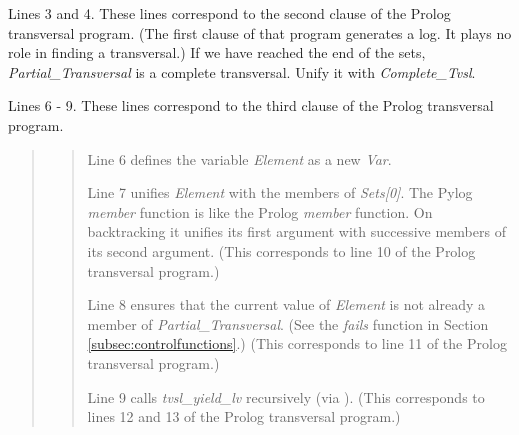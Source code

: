 Lines 3 and 4. These lines correspond to the second clause of the Prolog transversal program. (The first clause of that program generates a log. It plays no role in finding a transversal.) If we have reached the end of the sets, \textit{Partial\_Transversal} is a complete transversal. Unify it with \textit{Complete\_Tvsl}.

Lines 6 - 9. These lines correspond to the third clause of the Prolog transversal program.

\begin{quote}
\begin{quote}
Line 6 defines the variable \textit{Element} as a new \textit{Var}.

\smallv
Line 7 unifies \textit{Element} with the members of \textit{Sets[0]}. The Pylog \textit{member} function is like the Prolog  \textit{member} function. On backtracking it unifies its first argument with successive members of its second argument. (This corresponds to line 10 of the Prolog transversal program.)

\smallv
Line 8 ensures that the current value of  \textit{Element} is not already a member of \textit{Partial\_Transversal}. (See the \textit{fails} function in Section \ref{subsec:controlfunctions}.)  (This corresponds to line 11 of the Prolog transversal program.)

\smallv
Line 9 calls \textit{tvsl\_yield\_lv} recursively (via ). (This corresponds to lines 12 and 13 of the Prolog transversal program.)
\end{quote}
\end{quote}

